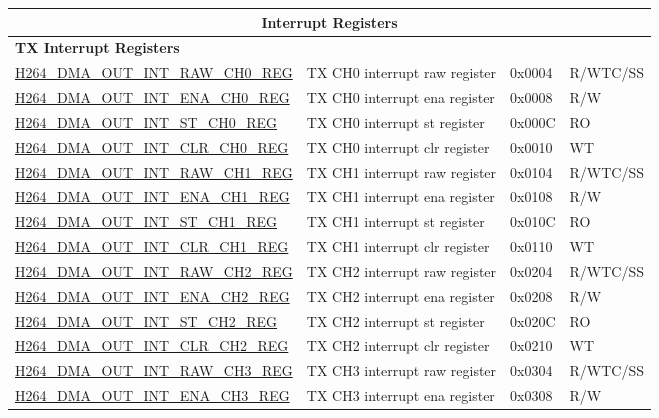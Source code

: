 \begin{longtable}{ | p{7.5cm} | p{5.7cm} | p{1.2cm} | p{1cm} | }
    \multicolumn{4}{|c|}{\cellcolor{gray!15}\textbf{Interrupt Registers}} \\ \hline
    \multicolumn{4}{|l|}{\textbf{TX Interrupt Registers}} \\ \hline
    \hyperref[regdesc:H264DMAOUTINTRAWCH0REG]{H264\_DMA\_OUT\_INT\_RAW\_CH0\_REG} & TX CH0  interrupt raw register & 0x0004 & R/WTC/SS \\ \hline
    \hyperref[regdesc:H264DMAOUTINTENACH0REG]{H264\_DMA\_OUT\_INT\_ENA\_CH0\_REG} & TX CH0  interrupt ena register & 0x0008 & R/W \\ \hline
    \hyperref[regdesc:H264DMAOUTINTSTCH0REG]{H264\_DMA\_OUT\_INT\_ST\_CH0\_REG} & TX CH0  interrupt st register & 0x000C & RO \\ \hline
    \hyperref[regdesc:H264DMAOUTINTCLRCH0REG]{H264\_DMA\_OUT\_INT\_CLR\_CH0\_REG} & TX CH0  interrupt clr register & 0x0010 & WT \\ \hline
    \hyperref[regdesc:H264DMAOUTINTRAWCH1REG]{H264\_DMA\_OUT\_INT\_RAW\_CH1\_REG} & TX CH1  interrupt raw register & 0x0104 & R/WTC/SS \\ \hline
    \hyperref[regdesc:H264DMAOUTINTENACH1REG]{H264\_DMA\_OUT\_INT\_ENA\_CH1\_REG} & TX CH1  interrupt ena register & 0x0108 & R/W \\ \hline
    \hyperref[regdesc:H264DMAOUTINTSTCH1REG]{H264\_DMA\_OUT\_INT\_ST\_CH1\_REG} & TX CH1  interrupt st register & 0x010C & RO \\ \hline
    \hyperref[regdesc:H264DMAOUTINTCLRCH1REG]{H264\_DMA\_OUT\_INT\_CLR\_CH1\_REG} & TX CH1  interrupt clr register & 0x0110 & WT \\ \hline
    \hyperref[regdesc:H264DMAOUTINTRAWCH2REG]{H264\_DMA\_OUT\_INT\_RAW\_CH2\_REG} & TX CH2  interrupt raw register & 0x0204 & R/WTC/SS \\ \hline
    \hyperref[regdesc:H264DMAOUTINTENACH2REG]{H264\_DMA\_OUT\_INT\_ENA\_CH2\_REG} & TX CH2  interrupt ena register & 0x0208 & R/W \\ \hline
    \hyperref[regdesc:H264DMAOUTINTSTCH2REG]{H264\_DMA\_OUT\_INT\_ST\_CH2\_REG} & TX CH2  interrupt st register & 0x020C & RO \\ \hline
    \hyperref[regdesc:H264DMAOUTINTCLRCH2REG]{H264\_DMA\_OUT\_INT\_CLR\_CH2\_REG} & TX CH2  interrupt clr register & 0x0210 & WT \\ \hline
    \hyperref[regdesc:H264DMAOUTINTRAWCH3REG]{H264\_DMA\_OUT\_INT\_RAW\_CH3\_REG} & TX CH3  interrupt raw register & 0x0304 & R/WTC/SS \\ \hline
    \hyperref[regdesc:H264DMAOUTINTENACH3REG]{H264\_DMA\_OUT\_INT\_ENA\_CH3\_REG} & TX CH3  interrupt ena register & 0x0308 & R/W \\ \hline

\end{longtable}
